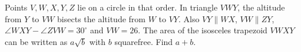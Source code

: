 Points $V,W,X,Y,Z$ lie on a circle in that order. In triangle $VWY$, the altitude from $Y$ to $VW$ bisects the altitude from $W$ to $VY$. Also $VY\parallel WX$, $VW\parallel ZY$, $\angle WXY-\angle ZVW=30^\circ$ and $VW=26$. The area of the isosceles trapezoid $VWXY$ can be written as $a\sqrt b$ with $b$ squarefree. Find $a+b$.
